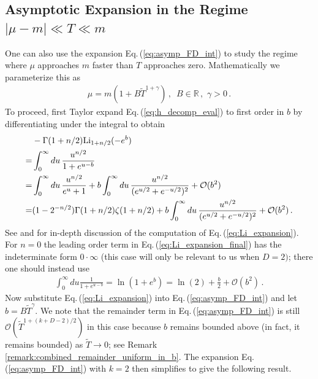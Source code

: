 \documentclass[sn-mathphys,Numbered]{sn-jnl}
\newcommand{\req}[1]{Eq.\,(\ref{#1})}
\begin{document}
\subsection{Asymptotic Expansion in the Regime $|\mu-m|\ll T\ll m$}\label{sec:decaying_b}
One can also use the expansion \req{eq:asymp_FD_int} to study the regime where $\mu$ approaches $m$ faster than $T$ approaches zero. Mathematically we parameterize this as 
\begin{align}\label{eq:mu_decay_faster}
\mu=m(1+B\widetilde{T}^{1+\gamma})\,,\,\,\, B\in\mathbb{R}\,,\,\, \gamma>0\,. 
\end{align}
 To proceed, first Taylor expand \req{eq:h_decomp_eval} to first order in $b$ by differentiating under the integral to obtain
\begin{align}\label{eq:Li_expansion}
 &-\Gamma(1+n/2)\mathrm{Li}_{1+n/2}(-e^b)\\
 =&\int_0^\infty du \, \frac{u^{n/2}}{1+e^{u-b}} \notag\\
 =&\int_0^\infty du\,\frac{u^{n/2}}{e^u+1}+b\int_0^\infty du\,\frac{u^{n/2}}{(e^{u/2}+e^{-u/2})^2} +\mathcal{O}(b^2)\notag\\
 =&(1 - 2^{-n/2}) \Gamma(1 + n/2) \zeta(1 + n/2)+ b\int_0^\infty du\,\frac{u^{n/2}}{(e^{u/2}+e^{-u/2})^2} +\mathcal{O}(b^2)\,.\label{eq:Li_expansion_final}
\end{align}
See \cite{dingle1957fermi} and \cite{10.1063/1.1350634} for in-depth discussion of the computation of \req{eq:Li_expansion}. For $n=0$ the leading order term in \req{eq:Li_expansion_final} has the indeterminate form $0\cdot \infty$ (this case will only be relevant to us when $D=2)$; there one should instead use
\begin{align}
\int_0^\infty du \frac{1}{1+e^{u-b}}=\ln(1+e^b)= \ln(2)+\frac{b}{2}+\mathcal{O}(b^2)\,.
\end{align}
Now substitute \req{eq:Li_expansion} into \req{eq:asymp_FD_int} and let $b=B\widetilde{T}^\gamma$. We note that the remainder term in \req{eq:asymp_FD_int} is still $\mathcal{O}(\widetilde{T}^{1+(k+D-2)/2})$ in this case because $b$ remains bounded above (in fact, it remains bounded) as $\widetilde{T}\to 0$; see Remark \ref{remark:combined_remainder_uniform_in_b}. The expansion \req{eq:asymp_FD_int} with $k=2$ then simplifies to give the following result.
\end{document}
